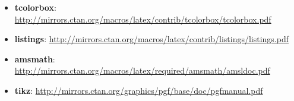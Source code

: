 \documentclass[]{csnotes}
\begin{document}
\begin{itemize}
    \item \textbf{tcolorbox}: \url{http://mirrors.ctan.org/macros/latex/contrib/tcolorbox/tcolorbox.pdf}
    \item \textbf{listings}: \url{http://mirrors.ctan.org/macros/latex/contrib/listings/listings.pdf}
    \item \textbf{amsmath}: \url{http://mirrors.ctan.org/macros/latex/required/amsmath/amsldoc.pdf}
    \item \textbf{tikz}: \url{http://mirrors.ctan.org/graphics/pgf/base/doc/pgfmanual.pdf}
\end{itemize}

\makebackcover{}

\end{document}
